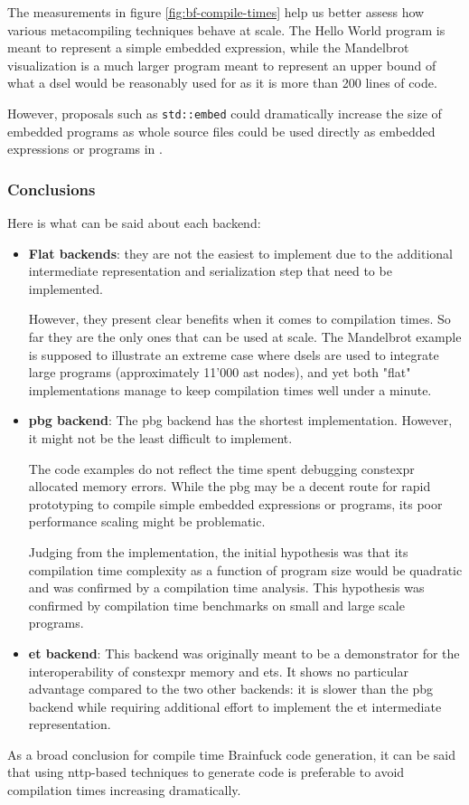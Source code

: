 \documentclass[../main]{subfiles}
\begin{document}
The measurements in figure \ref{fig:bf-compile-times} help us better assess
how various metacompiling techniques behave at scale.
The Hello World program is meant to represent a simple embedded expression,
while the Mandelbrot visualization is a much larger program meant to represent
an upper bound of what a \gls{dsel} would be reasonably used for as it is more
than 200 lines of code.

However, proposals such as \lstinline{std::embed} \cite{stdembed}
could dramatically increase the size of embedded programs as whole source files
could be used directly as embedded expressions or programs in \cpp.

\subsubsection{
  Conclusions
}

Here is what can be said about each backend:

\begin{itemize}

\item
\textbf{Flat backends}:
they are not the easiest to implement due to the additional intermediate
representation and serialization step that need to be implemented.

However, they present clear benefits when it comes to compilation times.
So far they are the only ones that can be used at scale.
The Mandelbrot example is supposed to illustrate an extreme case where
\glspl{dsel} are used to integrate large programs (approximately 11'000
\gls{ast} nodes), and yet both "flat" implementations manage to keep compilation
times well under a minute.

\item
\textbf{\gls{pbg} backend}:
The \gls{pbg} backend has the shortest implementation.
However, it might not be the least difficult to implement.

The code examples do not reflect the time spent debugging \gls{constexpr}
allocated memory errors. While the \gls{pbg} may be a decent route for
rapid prototyping to compile simple embedded expressions or programs,
its poor performance scaling might be problematic.

Judging from the implementation, the initial hypothesis was that its
compilation time complexity as a function of program size would be quadratic
and was confirmed by a compilation time analysis.
This hypothesis was confirmed by compilation time benchmarks on small
and large scale programs.

\item
\textbf{\gls{et} backend}:
This backend was originally meant to be a demonstrator for the interoperability
of \gls{constexpr} memory and \glspl{et}. It shows no particular advantage
compared to the two other backends: it is slower than the \gls{pbg} backend while
requiring additional effort to implement the \gls{et}
intermediate representation.

\end{itemize}

As a broad conclusion for compile time Brainfuck code generation,
it can be said that using \gls{nttp}-based techniques to generate code
is preferable to avoid compilation times increasing dramatically.
\end{document}
